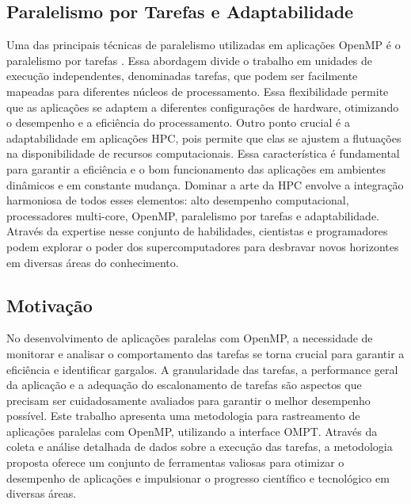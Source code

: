 \documentclass[ppgc,diss]{iiufrgs}
\begin{document}
\subsection{Paralelismo por Tarefas e Adaptabilidade}
Uma das principais técnicas de paralelismo utilizadas em aplicações OpenMP é o paralelismo por tarefas \citep{Chapman2007UsingOpenMP}. Essa abordagem divide o trabalho em unidades de execução independentes, denominadas tarefas, que podem ser facilmente mapeadas para diferentes núcleos de processamento. Essa flexibilidade permite que as aplicações se adaptem a diferentes configurações de hardware, otimizando o desempenho e a eficiência do processamento.
Outro ponto crucial é a adaptabilidade em aplicações HPC, pois permite que elas se ajustem a flutuações na disponibilidade de recursos computacionais. Essa característica é fundamental para garantir a eficiência e o bom funcionamento das aplicações em ambientes dinâmicos e em constante mudança.
Dominar a arte da HPC envolve a integração harmoniosa de todos esses elementos: alto desempenho computacional, processadores multi-core, OpenMP, paralelismo por tarefas e adaptabilidade. Através da expertise nesse conjunto de habilidades, cientistas e programadores podem explorar o poder dos supercomputadores para desbravar novos horizontes em diversas áreas do conhecimento.

\subsection{Motivação}
No desenvolvimento de aplicações paralelas com OpenMP, a necessidade de monitorar e analisar o comportamento das tarefas se torna crucial para garantir a eficiência e identificar gargalos. A granularidade das tarefas, a performance geral da aplicação e a adequação do escalonamento de tarefas são aspectos que precisam ser cuidadosamente avaliados para garantir o melhor desempenho possível.
Este trabalho apresenta uma metodologia para rastreamento de aplicações paralelas com OpenMP, utilizando a interface OMPT. Através da coleta e análise detalhada de dados sobre a execução das tarefas, a metodologia proposta oferece um conjunto de ferramentas valiosas para otimizar o desempenho de aplicações e impulsionar o progresso científico e tecnológico em diversas áreas.
\end{document}
